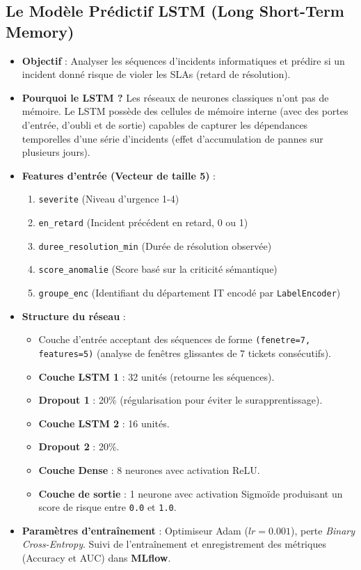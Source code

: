 \documentclass[11pt,a4paper]{article}
\begin{document}
\subsection{Le Modèle Prédictif LSTM (Long Short-Term Memory)}
\begin{itemize}
    \item \textbf{Objectif} : Analyser les séquences d'incidents informatiques et prédire si un incident donné risque de violer les SLAs (retard de résolution).
    \item \textbf{Pourquoi le LSTM ?} Les réseaux de neurones classiques n'ont pas de mémoire. Le LSTM possède des cellules de mémoire interne (avec des portes d'entrée, d'oubli et de sortie) capables de capturer les dépendances temporelles d'une série d'incidents (effet d'accumulation de pannes sur plusieurs jours).
    \item \textbf{Features d'entrée (Vecteur de taille 5)} :
    \begin{enumerate}
        \item \texttt{severite} (Niveau d'urgence 1-4)
        \item \texttt{en\_retard} (Incident précédent en retard, 0 ou 1)
        \item \texttt{duree\_resolution\_min} (Durée de résolution observée)
        \item \texttt{score\_anomalie} (Score basé sur la criticité sémantique)
        \item \texttt{groupe\_enc} (Identifiant du département IT encodé par \texttt{LabelEncoder})
    \end{enumerate}
    \item \textbf{Structure du réseau} :
    \begin{itemize}
        \item Couche d'entrée acceptant des séquences de forme \texttt{(fenetre=7, features=5)} (analyse de fenêtres glissantes de 7 tickets consécutifs).
        \item \textbf{Couche LSTM 1} : 32 unités (retourne les séquences).
        \item \textbf{Dropout 1} : 20\% (régularisation pour éviter le surapprentissage).
        \item \textbf{Couche LSTM 2} : 16 unités.
        \item \textbf{Dropout 2} : 20\%.
        \item \textbf{Couche Dense} : 8 neurones avec activation ReLU.
        \item \textbf{Couche de sortie} : 1 neurone avec activation Sigmoïde produisant un score de risque entre \texttt{0.0} et \texttt{1.0}.
    \end{itemize}
    \item \textbf{Paramètres d'entraînement} : Optimiseur Adam ($lr=0.001$), perte \textit{Binary Cross-Entropy}. Suivi de l'entraînement et enregistrement des métriques (Accuracy et AUC) dans \textbf{MLflow}.
\end{itemize}
\end{document}
